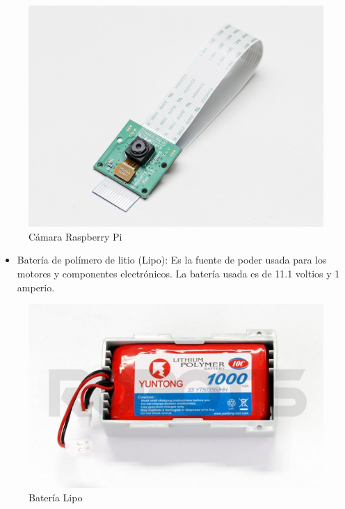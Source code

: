 \begin{figure}[hbtp]
\centering
\includegraphics[scale=0.35]{imagenes/1367-01.jpg}
\caption{C\'amara Raspberry Pi}
\label{fig:came}
\end{figure}


\begin{itemize}
\item Batería de polímero de litio (Lipo): Es la fuente de poder usada para los motores y componentes electr\'onicos. La batería usada es de 11.1 voltios y 1 amperio. \cite{bateria}
\end{itemize}


\begin{figure}[hbtp]
\centering
\includegraphics[scale=0.3]{imagenes/R-LIPOBAT.jpg}
\caption{Batería Lipo}
\label{bateria}
\end{figure}

